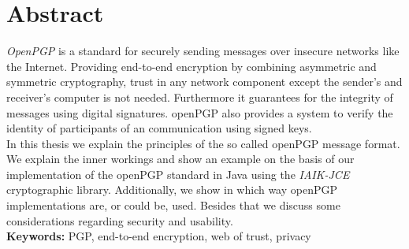 

\chapter*{Abstract}
\label{cha:abstract}



\emph{OpenPGP} is a standard for securely sending messages over insecure networks like the Internet. Providing end-to-end encryption by combining asymmetric and symmetric cryptography, trust in any network component except the sender's and receiver's computer is not needed. Furthermore it guarantees for the integrity of messages using digital signatures. openPGP also provides a system to verify the identity of participants of an communication using signed keys. \\
 
 
 In this thesis we explain the principles of the so called openPGP message format. 
 We explain the inner workings and show an example on the basis of our implementation 
 of the openPGP standard in Java using the \emph{IAIK-JCE} cryptographic library. 
 Additionally, we show in which way openPGP implementations are, or could be, used.
 Besides that we discuss some considerations regarding security and usability. \\






\textbf{Keywords:} PGP, end-to-end encryption, web of trust, privacy

